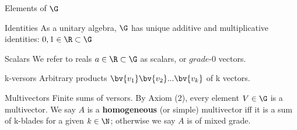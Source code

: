 \begin{definition}{Elements of $\G$}
    \begin{block}{Identities}
        As a unitary algebra, $\G$ has unique additive and multiplicative identities: $0, 1 \in \R \subset \G$
    \end{block}
    \begin{block}{Scalars}
        We refer to reals $a \in \R \subset \G$ as scalars, or $\textit{grade-0}$ vectors.
    \end{block}
    \begin{block}{k-versors}
        Arbitrary products $\bv{v_1}\bv{v_2}...\bv{v_k}$ of k vectors.
    \end{block}
    \begin{block}{Multivectors}
		Finite sums of versors. By Axiom (2), every element $V \in \G$ is a multivector. We say $A$ is a \textbf{homogeneous} (or simple) multivector iff it is a sum of k-blades for a given $k \in \N$; otherwise we say $A$ is of mixed grade.
    \end{block}
\end{definition}
